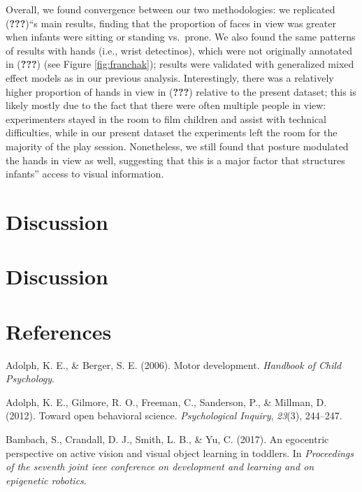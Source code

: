 \documentclass[english,man,floatsintext,draftall]{apa6}
\begin{document}
Overall, we found convergence between our two methodologies: we
replicated ({\textbf{???}})\enquote{s main results, finding that the
proportion of faces in view was greater when infants were sitting or
standing vs.~prone. We also found the same patterns of results with
hands (i.e., wrist detectinos), which were not originally annotated in
({\textbf{???}}) (see Figure \ref{fig:franchak}); results were validated
with generalized mixed effect models as in our previous analysis.
Interestingly, there was a relatively higher proportion of hands in view
in ({\textbf{???}}) relative to the present dataset; this is likely
mostly due to the fact that there were often multiple people in view:
experimenters stayed in the room to film children and assist with
technical difficulties, while in our present dataset the experiments
left the room for the majority of the play session. Nonetheless, we
still found that posture modulated the hands in view as well, suggesting
that this is a major factor that structures infants} access to visual
information.

\section{Discussion}\label{discussion}

\section{Discussion}\label{discussion-1}

\newpage

\section{References}\label{references}

\begingroup
\setlength{\parindent}{-0.5in} \setlength{\leftskip}{0.5in}

\hypertarget{refs}{}
\hypertarget{ref-adolph2006motor}{}
Adolph, K. E., \& Berger, S. E. (2006). Motor development.
\emph{Handbook of Child Psychology}.

\hypertarget{ref-adolph2012toward}{}
Adolph, K. E., Gilmore, R. O., Freeman, C., Sanderson, P., \& Millman,
D. (2012). Toward open behavioral science. \emph{Psychological Inquiry},
\emph{23}(3), 244--247.

\hypertarget{ref-bambach2017}{}
Bambach, S., Crandall, D. J., Smith, L. B., \& Yu, C. (2017). An
egocentric perspective on active vision and visual object learning in
toddlers. In \emph{Proceedings of the seventh joint ieee conference on
development and learning and on epigenetic robotics}.
\end{document}
